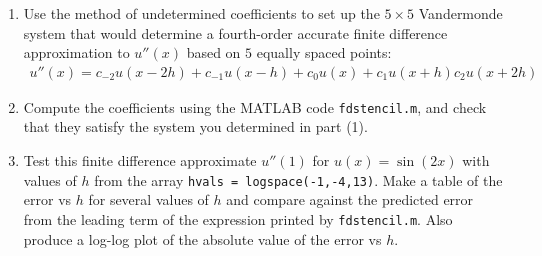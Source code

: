 \documentclass[12pt,twoside,openany]{memoir}
\begin{document}
\begin{exercise}[manual-num={1.2}]
    \phantom{a}
\begin{enumerate}[label = (\arabic*),itemsep=1pt,topsep=3pt]
    \item Use the method of undetermined coefficients to set up the $5 \times 5$ Vandermonde system that would determine a fourth-order accurate finite difference approximation to $u''(x)$ based on $5$ equally spaced points:
        \begin{equation*}
        \begin{split}
            u''(x) = c_{-2}u(x-2h) + c_{-1}u(x-h) + c_0u(x) + c_{1}u(x+h)  c_{2}u(x+2h)
        \end{split}
        \end{equation*}
    \item Compute the coefficients using the \textsc{MATLAB} code \texttt{fdstencil.m}, and check that they satisfy the system you determined in part (1).
    \item Test this finite difference approximate $u''(1)$ for $u(x) = \sin(2x)$ with values of $h$ from the array \texttt{hvals = logspace(-1,-4,13)}. Make a table of the error vs $h$ for several values of $h$ and compare against the predicted error from the leading term of the expression printed by \texttt{fdstencil.m}. Also produce a log-log plot of the absolute value of the error vs $h$. 
\end{enumerate}
\end{exercise}
\end{document}
